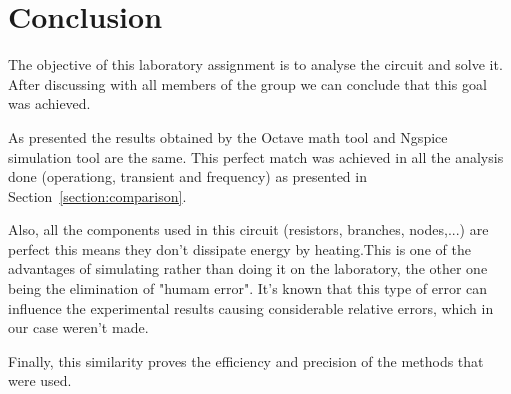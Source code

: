 \newpage
\section{Conclusion}
\label{sec:conclusion}


The objective of this laboratory assignment is to analyse the circuit and solve it. After discussing with all members of the group we can conclude that this goal was achieved.

As presented the results obtained by the Octave math tool and Ngspice simulation tool are the same. This perfect match was achieved in all the analysis done (operationg, transient and frequency) as presented in Section~\ref{section:comparison}.

Also, all the components used in this circuit (resistors, branches, nodes,...) are perfect this means they don't dissipate energy by heating.This is one of the advantages of simulating rather than doing it on the laboratory, the other one being the elimination of "humam error". It's known that this type of error can influence the experimental results causing considerable relative errors, which in our case weren't made.

Finally, this similarity proves the efficiency and precision of the methods that were used.


